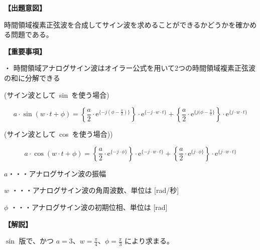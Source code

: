 \noindent \textbf{【出題意図】}

\bigskip
\noindent 時間領域複素正弦波を合成してサイン波を求めることができるかどうかを確かめる問題である。

\vspace{1em}
\noindent \textbf{【重要事項】}

\medskip
\noindent ・ 時間領域アナログサイン波はオイラー公式を用いて2つの時間領域複素正弦波の和に分解できる

\medskip
\noindent \mbox{(サイン波として sin を使う場合)}

\[
a \cdot \sin ( w \cdot t + \phi )
=  \left \{ \frac{a}{2} \cdot \textrm{e}^{\{-j (\phi-\frac{\pi}{2}) \}} \right \} \cdot \textrm{e}^{\{-j \cdot w \cdot t \}}
+  \left \{ \frac{a}{2} \cdot \textrm{e}^{\{j (\phi-\frac{\pi}{2} \}} \right \} \cdot \textrm{e}^{\{j \cdot w \cdot t \}}
\]

\medskip
\noindent \mbox{(サイン波として cos を使う場合))}

\[
a \cdot \cos ( w \cdot t + \phi )
=  \left \{ \frac{a}{2} \cdot \textrm{e}^{\{-j \cdot \phi \}} \right \} \cdot \textrm{e}^{\{-j \cdot w \cdot t \}}
+  \left \{ \frac{a}{2} \cdot \textrm{e}^{\{j  \cdot \phi \}} \right \} \cdot \textrm{e}^{\{j \cdot w \cdot t \}}
\]

\bigskip
\noindent  $a$・・・アナログサイン波の振幅

\bigskip
\noindent $w$ ・・・アナログサイン波の角周波数、単位は [rad/秒]

\bigskip
\noindent $\phi$ ・・・アナログサイン波の初期位相、単位は [rad]

\bigskip

\vspace{1em}
\noindent \textbf{【解説】}

\bigskip
\noindent $\sin$ 版で、かつ $a = 3$、$w = \frac{\pi}{4}$、$\phi = \frac{\pi}{3}$ により求まる。
